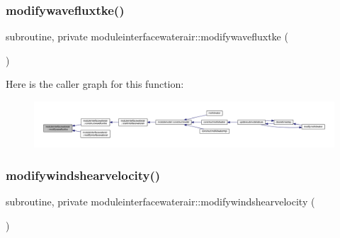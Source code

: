 \subsubsection{\texorpdfstring{modifywavefluxtke()}{modifywavefluxtke()}}
{\footnotesize\ttfamily subroutine, private moduleinterfacewaterair\+::modifywavefluxtke (\begin{DoxyParamCaption}{ }\end{DoxyParamCaption})\hspace{0.3cm}{\ttfamily [private]}}

Here is the caller graph for this function\+:\nopagebreak
\begin{figure}[H]
\begin{center}
\leavevmode
\includegraphics[width=350pt]{namespacemoduleinterfacewaterair_a2494cba9b6646ce732323f31ef820a97_icgraph}
\end{center}
\end{figure}
\mbox{\label{namespacemoduleinterfacewaterair_a067a8627bd218eba128377b9cca8031f}} 
\subsubsection{\texorpdfstring{modifywindshearvelocity()}{modifywindshearvelocity()}}
{\footnotesize\ttfamily subroutine, private moduleinterfacewaterair\+::modifywindshearvelocity (\begin{DoxyParamCaption}{ }\end{DoxyParamCaption})\hspace{0.3cm}{\ttfamily [private]}}

